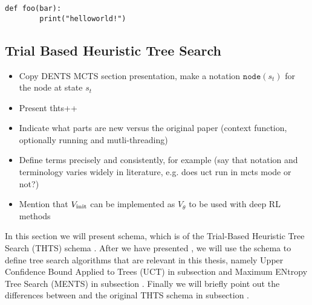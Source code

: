 
    \begin{lstlisting}
def foo(bar):
        print("helloworld!")
    \end{lstlisting}

    \subsection{Trial Based Heuristic Tree Search}
    \label{sec:2-2-1-thts}
    
        \begin{itemize}
            \item{Copy DENTS MCTS section presentation, make a notation } $\texttt{node}(s_t)$ for the node at state $s_t$
            \item Present thts++
            \item Indicate what parts are new versus the original paper (context function, optionally running \mctsmode\ewe and mutli-threading)
            \item Define terms precisely and consistently, for example \mctsmode\ewe (say that notation and terminology varies widely in literature, e.g. does uct run in mcts mode or not?)
            \item Mention that $V_{\textnormal{init}}$ can be implemented as $V_\theta$ to be used with deep RL methods
        \end{itemize}



        In this section we will present \thtspp schema, which is  of the Trial-Based Heuristic Tree Search (THTS) schema . After we have presented \thtspp, we will use the schema to define tree search algorithms that are relevant in this thesis, namely Upper Confidence Bound Applied to Trees (UCT)  in subsection  and Maximum ENtropy Tree Search (MENTS) in subsection . Finally we will briefly point out the differences between \thtspp and the original THTS schema in subsection .

